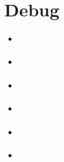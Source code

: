 \section{Debug}

\begin{itemize}

 \item \autocite{link:CiteDrive2022}
 \item \autocite{enwiki:1151790558}
 \item \autocite{enwiki:13438122}
 \item \autocite{cybeprotest}
 \item \autocite{web}
 \item \autocite{sep-set-theory}

\end{itemize}

\printbibliography


